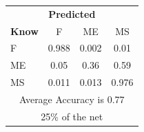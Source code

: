 \documentclass[12pt]{article} %
\begin{document}
\begin{minipage}{0.5\textwidth}
\begin{center}
\begin{tabular}{l|c|c|c|}
 \multicolumn{4}{c}{ \textbf{ Predicted}}\\
 \textbf{Know}&F&ME&MS\\ \hline\hline
F   &0.988&0.002&0.01\\
ME &0.05&0.36&0.59\\
MS &0.011&0.013&0.976\\
\multicolumn{4}{c}{Average Accuracy is 0.77}\\
\multicolumn{4}{c}{25\%  of the net}\\
\end{tabular}
\end{center}
\end{minipage}
\end{document}
